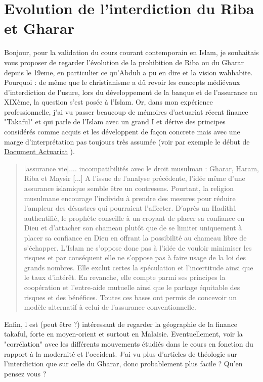 \chapter{Evolution de l'interdiction du Riba et Gharar}

Bonjour,
pour la validation du cours courant contemporain en Islam, je souhaitais vous proposer de regarder l'évolution de la prohibition de Riba ou du Gharar depuis le 19eme, en particulier ce qu'Abduh a pu en dire et la vision wahhabite.
Pourquoi : de même que le christianisme a dû revoir les concepts médiévaux d'interdiction de l'usure, lors du développement de la banque et de l'assurance au XIXème, la question s'est posée à l'Islam.
Or, dans mon expérience professionnelle, j'ai vu passer beaucoup de mémoires d'actuariat récent finance "Takaful" et qui parle de l'Islam avec un grand I et dérive des principes considérés comme acquis et les développent de façon concrete mais avec une marge d'interprétation pas toujours très assumée (voir par exemple le début de
\href{http://www.ressources-actuarielles.net/EXT/ISFA/1226-02.nsf/0/8c814ff5f2bae57ec1257e1a004407b6/\%24FILE/Memoire_ISFA_Tontines_et_Takaful_Bendimerad_Version_avec_Couverture.pdf}{Document Actuariat} ).
\begin{quote}
    [assurance vie].... incompatibilités avec le droit musulman : Gharar, Haram, Riba et Maysir [...]
A l'issue de l'analyse précédente, l'idée même d'une assurance islamique semble être un contresens. Pourtant, la religion musulmane encourage l'individu à prendre des mesures pour réduire l'ampleur des désastres qui pourraient l'affecter. D'après un Hadith1 authentifié, le prophète conseille à un croyant de placer sa confiance en Dieu et d'attacher son chameau plutôt que de se limiter uniquement à placer sa confiance en Dieu en offrant la possibilité au chameau libre de s'échapper. L'Islam ne s'oppose donc pas à l'idée de vouloir minimiser les risques et par conséquent elle ne s'oppose pas à faire usage de la loi des grands nombres. Elle exclut certes la spéculation et l'incertitude ainsi que le taux d'intérêt. En revanche, elle compte parmi ses principes la coopération et l'entre-aide mutuelle ainsi que le partage équitable des risques et des bénéfices. Toutes ces bases ont permis de concevoir un modèle alternatif à celui de l'assurance conventionnelle.
\end{quote}
 

Enfin, l est (peut être ?) intéressant de regarder la géographie de la finance takaful, forte en moyen-orient et surtout en Malaisie. Eventuellement, voir la "corrélation" avec les différents mouvements étudiés dans le cours en fonction du rapport à la modernité et l'occident.
J'ai vu plus d'articles de théologie sur l'interdiction que sur celle du Gharar, donc probablement plus facile ?
Qu'en pensez vous ?

